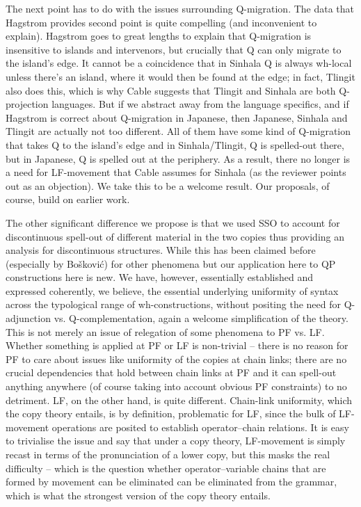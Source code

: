 \documentclass[11pt]{article}
\begin{document}
The next point has to do with the issues surrounding Q-migration. The data that Hagstrom provides second point is quite compelling (and inconvenient to explain). Hagstrom goes to great lengths to explain that Q-migration is insensitive to islands and intervenors, but crucially that Q can only migrate to the island's edge. It cannot be a coincidence that in Sinhala Q is always wh-local unless there's an island, where it would then be found at the edge; in fact, Tlingit also does this, which is why Cable suggests that Tlingit and Sinhala are both Q-projection languages. But if we abstract away from the language specifics, and if Hagstrom is correct about Q-migration in Japanese, then Japanese, Sinhala and Tlingit are actually not too different. All of them have some kind of Q-migration that takes Q to the island's edge and in Sinhala/Tlingit, Q is spelled-out there, but in Japanese, Q is spelled out at the periphery. As a result, there no longer is a need for LF-movement that Cable assumes for Sinhala (as the reviewer points out as an objection). We take this to be a welcome result. Our proposals, of course, build on earlier work.

The other significant difference we propose is that we used SSO to account for discontinuous spell-out of different material in the two copies thus providing an analysis for discontinuous structures. While this has been claimed before (especially by Bo\v{s}kovi\'{c}) for other phenomena but our application here to QP constructions here is new. We have, however, essentially established and expressed coherently, we believe, the essential  underlying uniformity of syntax across the typological range of wh-constructions, without positing the need for Q-adjunction vs. Q-complementation, again a welcome simplification of the theory. This is not merely an issue of relegation of some phenomena to PF vs. LF. Whether something is applied at PF or LF is non-trivial -- there is no reason for PF to care about issues like uniformity of the copies at chain links; there are no crucial dependencies that hold between chain links at PF and it can spell-out anything anywhere (of course taking into account obvious PF constraints) to no detriment. LF, on the other hand, is quite different. Chain-link uniformity, which the copy theory entails, is by definition, problematic for LF, since the bulk of LF-movement operations are posited to establish operator--chain relations. It is easy to trivialise the issue and say that under a copy theory, LF-movement is simply recast in terms of the pronunciation of a lower copy, but this masks the real difficulty -- which is the question whether operator--variable chains that are formed by movement can be eliminated can be eliminated from the grammar, which is what the strongest version of the copy theory entails.
\end{document}
